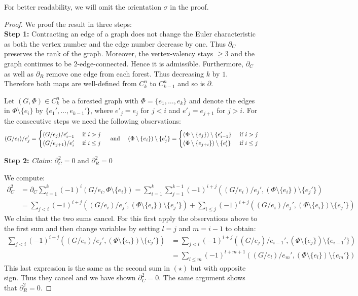 For better readability, we will omit the orientation $\sigma$ in the proof.
\begin{proof}
	We proof the result in three steps:\\
	\textbf{Step 1:} Contracting an edge of a graph does not change the Euler characteristic as both the vertex number and the edge number decrease by one.
	Thus $\partial_{C}$ preserves the rank of the graph. Moreover, the vertex-valency stays $\geq 3$ and the graph continues to be $2$-edge-connected.
	Hence it is admissible.
	Furthermore, $\partial_{C}$ as well as $\partial_{R}$ remove one edge from each forest. Thus decreasing
	$k$ by $1$. Therefore both maps are well-defined from $C^{n}_{k}$ to $C^{n}_{k-1}$ and so is $\partial$.

	Let $(G,\Phi) \in C^{n}_{k}$ be a forested graph with $\Phi = \{e_1,\ldots,e_{k}\}$  and denote the edges in $\Phi \setminus \{e_{i}\}$ by $\{e_1',\ldots,e_{k-1}'\}$,
	where $e'_{j} = e_{j}$ for $j < i$ and $e'_{j} = e_{j+1}$ for $j > i$.
	For the consecutive steps we need the following observations:
	\[
		(G / e_{i}) /  e_{j}' = \begin{cases}
			(G / e_{j}) / e_{i-1}' & \text{ if } i > j\\
			(G / e_{j+1}) / e_{i}' & \text{ if } i \leq j
		\end{cases}
		\qq{ and }
		(\Phi \setminus \{e_{i}\}) \setminus \{e_{j}'\}  = \begin{cases}	
			(\Phi \setminus \{e_{j}\}) \setminus \{e_{i-1}'\} & \text{ if } i > j\\
			(\Phi \setminus \{e_{j+i}\}) \setminus \{e_{i}'\} & \text{ if } i \leq j
		\end{cases}
	\]

	\textbf{Step 2:} \emph{Claim:} $\partial_{C}^2 = 0$ and $\partial_{R}^2 = 0$

	We compute:
	\begin{align*}
		\partial_{C}^2 &= \partial_{C} \sum_{i=1}^{k} (-1)^{i}(G / e_{i}, \Phi \setminus \{e_{i}\})
		=  \sum_{i=1}^{k} \sum_{j=1}^{k-1} (-1)^{i+j}((G / e_{i}) / e_{j}', (\Phi \setminus \{e_{i}\} ) \setminus \{e_{j}'\})  \\
					   &= \sum_{j < i} (-1)^{i+j} ((G / e_{i}) / e_{j}', (\Phi \setminus \{e_{i}\} ) \setminus \{e_{j}'\}) + \sum_{i \leq j} (-1)^{i+j}
					   ((G / e_{i}) / e_{j}', (\Phi \setminus \{e_{i}\} ) \setminus \{e_{j}'\}) \tag{$\star$}
	\end{align*}
	We claim that the two sums cancel. For this first apply the observations above to the first sum and then change variables by setting $l = j$ and  $m = i-1$ to obtain:
	\begin{align*}
		\sum_{j < i} (-1)^{i+j} ((G / e_{i}) / e_{j}', (\Phi \setminus \{e_{i}\}) \setminus \{e_{j}'\} ) &= 
		\sum_{j < i} (-1)^{i+j}((G / e_{j}) / e_{i-1}', (\Phi \setminus \{e_{j}\}) \setminus \{e_{i-1}'\} ) \\ 
		&= \sum_{l \leq m} (-1)^{l+m+1} ((G / e_{l}) / e_{m}', (\Phi \setminus \{e_{l}\}) \setminus \{e_{m}'\} ) 
	\end{align*}
	This last expression is the same as the second sum in $(\star)$ but with opposite sign. Thus they cancel and we have shown $\partial_{C}^2 = 0$.
	The same argument shows that $\partial_{R}^2 = 0$.


\end{proof}
